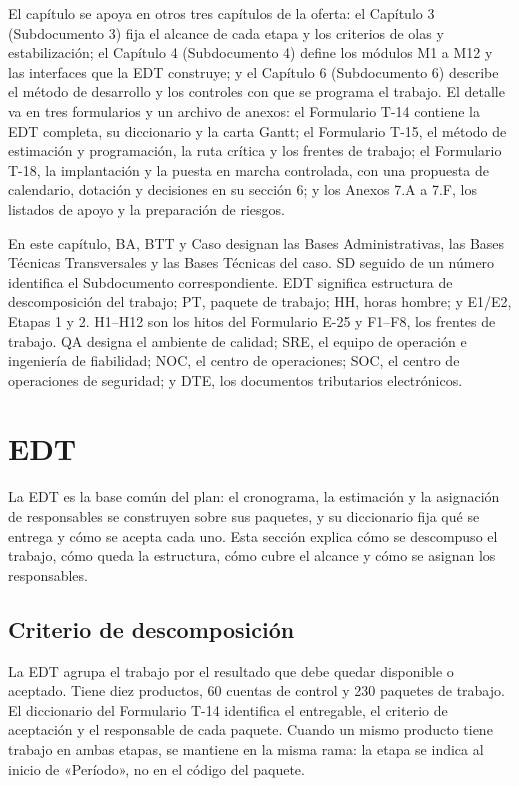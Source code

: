 El capítulo se apoya en otros tres capítulos de la oferta: el Capítulo 3 (Subdocumento 3) fija el alcance de cada etapa y los criterios de olas y estabilización; el Capítulo 4 (Subdocumento 4) define los módulos M1 a M12 y las interfaces que la EDT construye; y el Capítulo 6 (Subdocumento 6) describe el método de desarrollo y los controles con que se programa el trabajo. El detalle va en tres formularios y un archivo de anexos: el Formulario T-14 contiene la EDT completa, su diccionario y la carta Gantt; el Formulario T-15, el método de estimación y programación, la ruta crítica y los frentes de trabajo; el Formulario T-18, la implantación y la puesta en marcha controlada, con una propuesta de calendario, dotación y decisiones en su sección 6; y los Anexos 7.A a 7.F, los listados de apoyo y la preparación de riesgos.

En este capítulo, BA, BTT y Caso designan las Bases Administrativas, las Bases Técnicas Transversales y las Bases Técnicas del caso. SD seguido de un número identifica el Subdocumento correspondiente. EDT significa estructura de descomposición del trabajo; PT, paquete de trabajo; HH, horas hombre; y E1/E2, Etapas 1 y 2. H1–H12 son los hitos del Formulario E-25 y F1–F8, los frentes de trabajo. QA designa el ambiente de calidad; SRE, el equipo de operación e ingeniería de fiabilidad; NOC, el centro de operaciones; SOC, el centro de operaciones de seguridad; y DTE, los documentos tributarios electrónicos.

\section{EDT}

La EDT es la base común del plan: el cronograma, la estimación y la asignación de responsables se construyen sobre sus paquetes, y su diccionario fija qué se entrega y cómo se acepta cada uno. Esta sección explica cómo se descompuso el trabajo, cómo queda la estructura, cómo cubre el alcance y cómo se asignan los responsables.

\subsection{Criterio de descomposición}

La EDT agrupa el trabajo por el resultado que debe quedar disponible o aceptado. Tiene diez productos, 60 cuentas de control y 230 paquetes de trabajo. El diccionario del Formulario T-14 identifica el entregable, el criterio de aceptación y el responsable de cada paquete. Cuando un mismo producto tiene trabajo en ambas etapas, se mantiene en la misma rama: la etapa se indica al inicio de «Período», no en el código del paquete.

